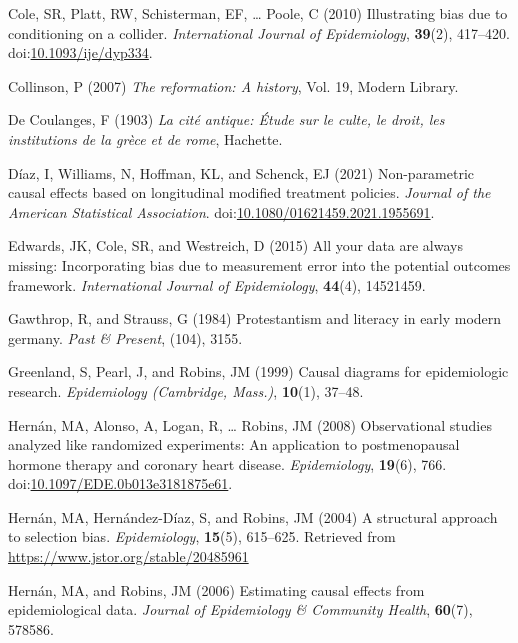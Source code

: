 \documentclass[
  singlecolumn,
  9pt]{article}
\newlength{\cslhangindent}
\newenvironment{CSLReferences}[2] %
 {\begin{list}{}{%
  \setlength{\itemindent}{0pt}
  \setlength{\leftmargin}{0pt}
  \setlength{\parsep}{0pt}
  \ifodd #1
   \setlength{\leftmargin}{\cslhangindent}
   \setlength{\itemindent}{-1\cslhangindent}
  \fi
  \setlength{\itemsep}{#2\baselineskip}}}
 {\end{list}}
\begin{document}
\begin{CSLReferences}{1}{0}
Cole, SR, Platt, RW, Schisterman, EF, \ldots{} Poole, C (2010)
Illustrating bias due to conditioning on a collider. \emph{International
Journal of Epidemiology}, \textbf{39}(2), 417--420.
doi:\href{https://doi.org/10.1093/ije/dyp334}{10.1093/ije/dyp334}.

Collinson, P (2007) \emph{The reformation: A history}, Vol. 19, Modern
Library.

De Coulanges, F (1903) \emph{La cité antique: Étude sur le culte, le
droit, les institutions de la grèce et de rome}, Hachette.

Díaz, I, Williams, N, Hoffman, KL, and Schenck, EJ (2021) Non-parametric
causal effects based on longitudinal modified treatment policies.
\emph{Journal of the American Statistical Association}.
doi:\href{https://doi.org/10.1080/01621459.2021.1955691}{10.1080/01621459.2021.1955691}.

Edwards, JK, Cole, SR, and Westreich, D (2015) All your data are always
missing: Incorporating bias due to measurement error into the potential
outcomes framework. \emph{International Journal of Epidemiology},
\textbf{44}(4), 14521459.

Gawthrop, R, and Strauss, G (1984) Protestantism and literacy in early
modern germany. \emph{Past \& Present}, (104), 3155.

Greenland, S, Pearl, J, and Robins, JM (1999) Causal diagrams for
epidemiologic research. \emph{Epidemiology (Cambridge, Mass.)},
\textbf{10}(1), 37--48.

Hernán, MA, Alonso, A, Logan, R, \ldots{} Robins, JM (2008)
Observational studies analyzed like randomized experiments: An
application to postmenopausal hormone therapy and coronary heart
disease. \emph{Epidemiology}, \textbf{19}(6), 766.
doi:\href{https://doi.org/10.1097/EDE.0b013e3181875e61}{10.1097/EDE.0b013e3181875e61}.

Hernán, MA, Hernández-Díaz, S, and Robins, JM (2004) A structural
approach to selection bias. \emph{Epidemiology}, \textbf{15}(5),
615--625. Retrieved from \url{https://www.jstor.org/stable/20485961}

Hernán, MA, and Robins, JM (2006) Estimating causal effects from
epidemiological data. \emph{Journal of Epidemiology \& Community
Health}, \textbf{60}(7), 578586.


\end{CSLReferences}
\end{document}
